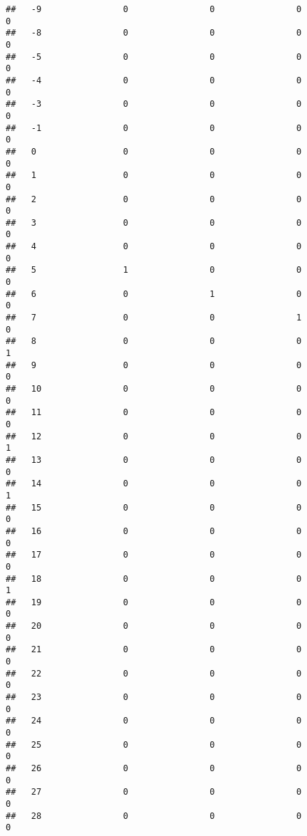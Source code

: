 \documentclass[]{article}
\begin{document}
\begin{verbatim}
##   -9                0                0                0                0
##   -8                0                0                0                0
##   -5                0                0                0                0
##   -4                0                0                0                0
##   -3                0                0                0                0
##   -1                0                0                0                0
##   0                 0                0                0                0
##   1                 0                0                0                0
##   2                 0                0                0                0
##   3                 0                0                0                0
##   4                 0                0                0                0
##   5                 1                0                0                0
##   6                 0                1                0                0
##   7                 0                0                1                0
##   8                 0                0                0                1
##   9                 0                0                0                0
##   10                0                0                0                0
##   11                0                0                0                0
##   12                0                0                0                1
##   13                0                0                0                0
##   14                0                0                0                1
##   15                0                0                0                0
##   16                0                0                0                0
##   17                0                0                0                0
##   18                0                0                0                1
##   19                0                0                0                0
##   20                0                0                0                0
##   21                0                0                0                0
##   22                0                0                0                0
##   23                0                0                0                0
##   24                0                0                0                0
##   25                0                0                0                0
##   26                0                0                0                0
##   27                0                0                0                0
##   28                0                0                0                0

\end{verbatim}
\end{document}
